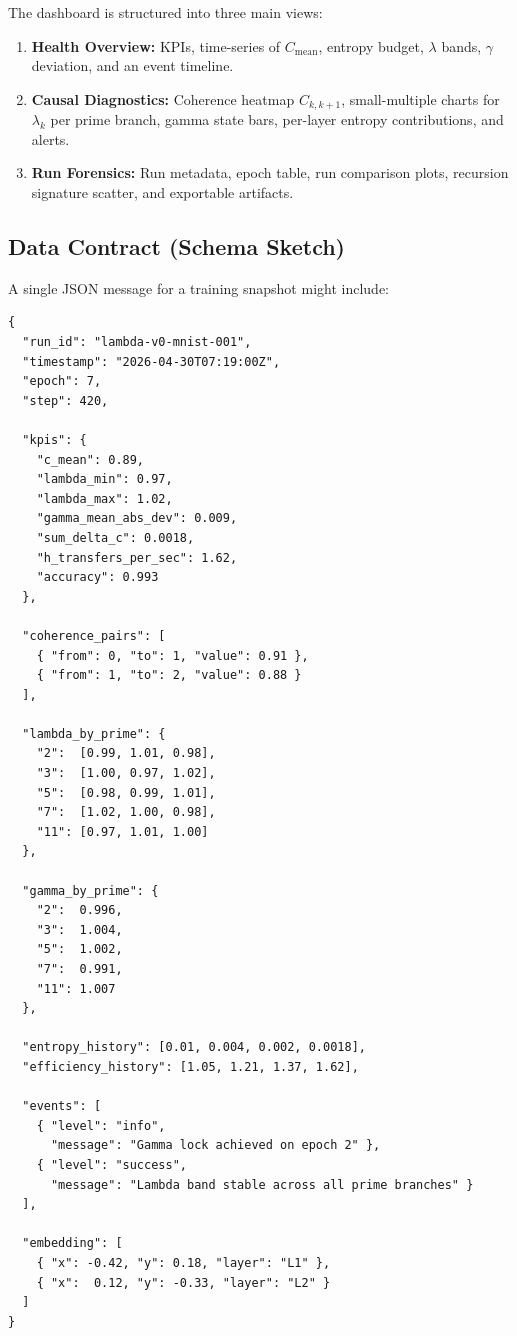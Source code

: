 \documentclass[11pt]{article}
\begin{document}
The dashboard is structured into three main views:

\begin{enumerate}
  \item \textbf{Health Overview:} KPIs, time-series of $C_{\text{mean}}$, entropy budget, $\lambda$ bands, $\gamma$ deviation, and an event timeline.
  \item \textbf{Causal Diagnostics:} Coherence heatmap $C_{k,k+1}$, small-multiple charts for $\lambda_k$ per prime branch, gamma state bars, per-layer entropy contributions, and alerts.
  \item \textbf{Run Forensics:} Run metadata, epoch table, run comparison plots, recursion signature scatter, and exportable artifacts.
\end{enumerate}

\subsection{Data Contract (Schema Sketch)}

A single JSON message for a training snapshot might include:

\begin{verbatim}
{
  "run_id": "lambda-v0-mnist-001",
  "timestamp": "2026-04-30T07:19:00Z",
  "epoch": 7,
  "step": 420,

  "kpis": {
    "c_mean": 0.89,
    "lambda_min": 0.97,
    "lambda_max": 1.02,
    "gamma_mean_abs_dev": 0.009,
    "sum_delta_c": 0.0018,
    "h_transfers_per_sec": 1.62,
    "accuracy": 0.993
  },

  "coherence_pairs": [
    { "from": 0, "to": 1, "value": 0.91 },
    { "from": 1, "to": 2, "value": 0.88 }
  ],

  "lambda_by_prime": {
    "2":  [0.99, 1.01, 0.98],
    "3":  [1.00, 0.97, 1.02],
    "5":  [0.98, 0.99, 1.01],
    "7":  [1.02, 1.00, 0.98],
    "11": [0.97, 1.01, 1.00]
  },

  "gamma_by_prime": {
    "2":  0.996,
    "3":  1.004,
    "5":  1.002,
    "7":  0.991,
    "11": 1.007
  },

  "entropy_history": [0.01, 0.004, 0.002, 0.0018],
  "efficiency_history": [1.05, 1.21, 1.37, 1.62],

  "events": [
    { "level": "info",
      "message": "Gamma lock achieved on epoch 2" },
    { "level": "success",
      "message": "Lambda band stable across all prime branches" }
  ],

  "embedding": [
    { "x": -0.42, "y": 0.18, "layer": "L1" },
    { "x":  0.12, "y": -0.33, "layer": "L2" }
  ]
}
\end{verbatim}
\end{document}
